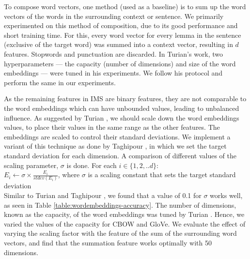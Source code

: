 To compose word vectors, one method (used as a baseline) is to sum up
the word vectors of the words in the surrounding context or
sentence. We primarily experimented on this method of composition, due
to its good performance and short training time. For this, every word
vector for every lemma in the sentence (exclusive of the target word)
was summed into a context vector, resulting in $d$ features. Stopwords
and punctuation are discarded. In Turian's
 work, two hyperparameters ---
the capacity (number of dimensions) and size of the word embeddings
--- were tuned in his experiments. We follow his protocol and perform
the same in our experiments.

As the remaining features in IMS are binary features, they are not
comparable to the word embeddings which can have unbounded values,
leading to unbalanced influence.  As suggested by Turian
, we should scale down the word
embeddings values, to place their values in the same range as the
other features. The embeddings are scaled to control their standard
deviations. We implement a variant of this technique as done by
Taghipour , in which we set the target standard
deviation for each dimension. A comparison of different values of the
scaling parameter, $\sigma$ is done. For each $i \in \{1, 2, .. d\}$:
\\

$E_{i} \leftarrow \sigma \times \frac{E_{i}}{stdev(E_{i})} $, where
$\sigma$ is a scaling constant that sets the target standard deviation
\\

Similar to Turian 
and Taghipour , we found that a value of 0.1
for $\sigma$ works well, as seen in Table
\ref{table:wordembeddings-accuracy}. The number of dimensions, known
as the capacity, of the word embeddings was tuned by Turian
. Hence, we varied the values
of the capacity for CBOW and GloVe. We evaluate the effect of varying the scaling factor with the feature
of the sum of the surrounding word vectors,  and find that the
summation feature works optimally with 50 dimensions.

